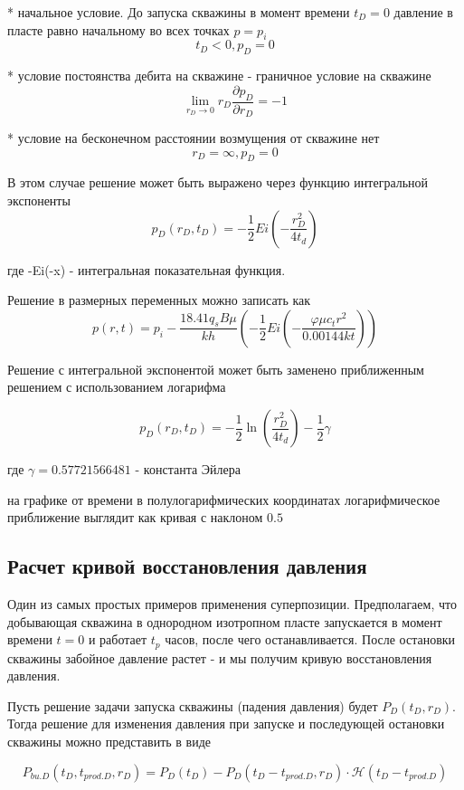\documentclass[oneside, openany]{memoir}
\begin{document}
	* начальное условие. До запуска скважины в момент времени  $t_D = 0$ давление в пласте равно начальному во всех точках $p=p_i$
	$$ t_D < 0, p_D = 0$$
	
	* условие постоянства дебита на скважине - граничное условие на скважине
	$$ \lim_{r_D \to 0} {r_D \frac{\partial p_D}{\partial r_D}} = -1 $$
	
	* условие на бесконечном расстоянии возмущения от скважине нет
	$$ r_D = \infty, p_D = 0 $$
	
	В этом случае решение может быть выражено через функцию интегральной экспоненты
	$$ p_D(r_D,t_D) = - \frac{1}{2} Ei \left(- \dfrac{ r_D^2}{4t_d} \right) $$
	
	где -Ei(-x) - интегральная показательная функция.
	
	Решение в размерных переменных можно записать как
	\begin{equation}
	p\left(r,t\right)=p_i-\frac{18.41q_sB\mu}{kh}\left(-\frac{1}{2} Ei \left(-\frac{\varphi\mu c_tr^2}{0.00144kt}\right)\right) 
	\end{equation}
	
	
	Решение с интегральной экспонентой может быть заменено приближенным решением с использованием логарифма 
	
	$$ 
	p_D(r_D,t_D) = - \frac{1}{2} \ln \left( \dfrac{ r_D^2}{4t_d} \right) - \frac{1}{2}\gamma 
	$$
	
	где $\gamma = 0.57721566481$ - константа Эйлера
	
	на графике от времени в полулогарифмических координатах логарифмическое приближение выглядит как кривая с наклоном $0.5$
	
	\subsection{Расчет кривой восстановления давления}
	
	Один из самых простых примеров применения суперпозиции. Предполагаем, что добывающая скважина в однородном изотропном пласте запускается в момент времени $t=0$ и работает $t_{p}$ часов, после чего останавливается. После остановки скважины забойное давление растет - и мы получим кривую восстановления давления.
	
	Пусть решение задачи запуска скважины (падения давления) будет $P_D(t_D, r_D)$. Тогда решение для изменения давления при запуске и последующей остановки скважины можно представить в виде 
	
	\begin{equation}
	P_{bu.D}(t_D, t_{prod.D}, r_D) = P_D(t_D) - P_D(t_D-t_{prod.D}, r_D) \cdot \mathcal{H}(t_D-t_{prod.D}) 
	\end{equation}
	
\end{document}

